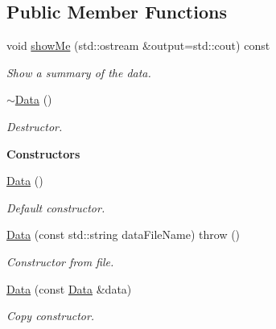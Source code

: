 \subsection*{Public Member Functions}
\begin{DoxyCompactItemize}
\item 
void \hyperlink{classFVCode3D_1_1Data_ad7d2ea783d794828e141bd57250c1120}{show\+Me} (std\+::ostream \&output=std\+::cout) const 
\begin{DoxyCompactList}\small\item\em Show a summary of the data. \end{DoxyCompactList}\item 
\hyperlink{classFVCode3D_1_1Data_ae5d0b57cc7ae6215e62c661e81034803}{$\sim$\+Data} ()
\begin{DoxyCompactList}\small\item\em Destructor. \end{DoxyCompactList}\end{DoxyCompactItemize}
\begin{Indent}{\bf Constructors}\par
\begin{DoxyCompactItemize}
\item 
\hyperlink{classFVCode3D_1_1Data_a2ab9e8e8f490af55c7d78163dfdb000c}{Data} ()
\begin{DoxyCompactList}\small\item\em Default constructor. \end{DoxyCompactList}\item 
\hyperlink{classFVCode3D_1_1Data_ae898de2278e74386b4dbab3a8be89ca9}{Data} (const std\+::string data\+File\+Name)  throw ()
\begin{DoxyCompactList}\small\item\em Constructor from file. \end{DoxyCompactList}\item 
\hyperlink{classFVCode3D_1_1Data_afe15e512e8571c67615456efded56c7a}{Data} (const \hyperlink{classFVCode3D_1_1Data}{Data} \&data)
\begin{DoxyCompactList}\small\item\em Copy constructor. \end{DoxyCompactList}\end{DoxyCompactItemize}
\end{Indent}
